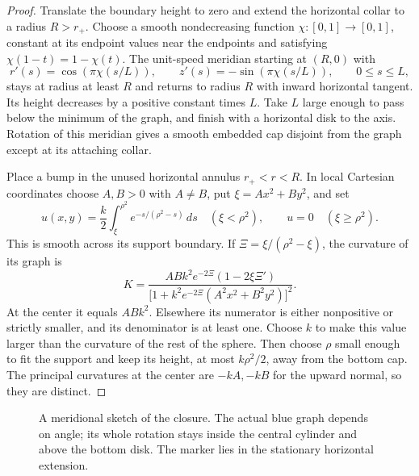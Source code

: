 \begin{proof}
Translate the boundary height to zero and extend the horizontal
collar to a radius $R>r_+$. Choose a smooth nondecreasing function
$\chi:[0,1]\to[0,1]$, constant at its endpoint values near the
endpoints and satisfying $\chi(1-t)=1-\chi(t)$. The unit-speed
meridian starting at $(R,0)$ with
\[
 r'(s)=\cos(\pi\chi(s/L)),\qquad
 z'(s)=-\sin(\pi\chi(s/L)),\qquad 0\le s\le L,
\]
stays at radius at least $R$ and returns to radius $R$ with inward
horizontal tangent. Its height decreases by a positive constant
times $L$. Take $L$ large enough to pass below the minimum of the
graph, and finish with a horizontal disk to the axis. Rotation of
this meridian gives a smooth embedded cap disjoint from the graph
except at its attaching collar.

Place a bump in the unused horizontal annulus $r_+<r<R$. In local
Cartesian coordinates choose $A,B>0$ with $A\ne B$, put
$\xi=Ax^2+By^2$, and set
\[
 u(x,y)=\frac{k}{2}\int_\xi^{\rho^2}
       e^{-s/(\rho^2-s)}\,ds\quad(\xi<\rho^2),
 \qquad u=0\quad(\xi\ge\rho^2).
\]
This is smooth across its support boundary. If
$\Xi=\xi/(\rho^2-\xi)$, the curvature of its graph is
\begin{equation}\label{eq:marker-curvature}
 K=\frac{ABk^2e^{-2\Xi}(1-2\xi\Xi')}
 {\bigl[1+k^2e^{-2\Xi}(A^2x^2+B^2y^2)\bigr]^2}.
\end{equation}
At the center it equals $ABk^2$. Elsewhere its numerator is either
nonpositive or strictly smaller, and its denominator is at least
one. Choose $k$ to make this value larger than the curvature of the
rest of the sphere. Then choose $\rho$ small enough to fit the
support and keep its height, at most $k\rho^2/2$, away from the
bottom cap. The principal curvatures at the center are $-kA,-kB$
for the upward normal, so they are distinct.
\end{proof}

\begin{figure}[htbp]
\centering
{}
\caption{A meridional sketch of the closure. The actual blue graph
depends on angle; its whole rotation stays inside the central
cylinder and above the bottom disk. The marker lies in the
stationary horizontal extension.}
\label{fig:geometric-closure}
\end{figure}

